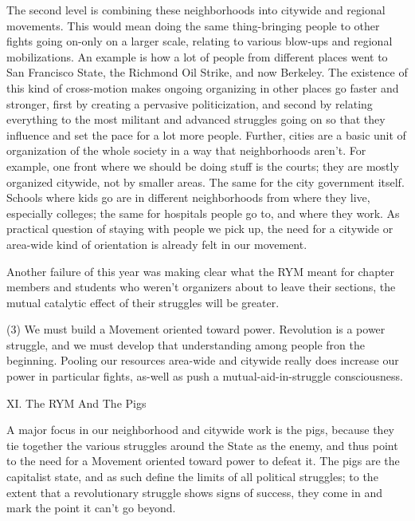 \documentclass[12pt, titlepage]{article}
\begin{document}
{\begin{spacing}{1.10}
The second level is combining these neighborhoods into citywide and regional movements. This would mean doing the same thing-bringing people to other fights going on-only on a larger scale, relating to various blow-ups and regional mobilizations. An example is how a lot of people from different places went to San Francisco State, the Richmond Oil Strike, and now Berkeley. The existence of this kind of cross-motion makes ongoing organizing in other places go faster and stronger, first by creating a pervasive politicization, and second by relating everything to the most militant and advanced struggles going on so that they influence and set the pace for a lot more people. Further, cities are a basic unit of organization of the whole society in a way that neighborhoods aren't. For example, one front where we should be doing stuff is the courts; they are mostly organized citywide, not by smaller areas. The same for the city government itself. Schools where kids go are in different neighborhoods from where they live, especially colleges; the same for hospitals people go to, and where they work. As practical question of staying with people we pick up, the need for a citywide or area-wide kind of orientation is already felt in our movement.

Another failure of this year was making clear what the RYM meant for chapter members and students who weren't organizers about to leave their sections, the mutual catalytic effect of their struggles will be greater.

(3) We must build a Movement oriented toward power. Revolution is a power struggle, and we must develop that understanding among people fron the beginning. Pooling our resources area-wide and citywide really does increase our power in particular fights, as-well as push a mutual-aid-in-struggle consciousness.

\begin{center}
XI. The RYM And The Pigs
\end{center}

A major focus in our neighborhood and citywide work is the pigs, because they tie together the various struggles around the State as the enemy, and thus point to the need for a Movement oriented toward power to defeat it. The pigs are the capitalist state, and as such define the limits of all political struggles; to the extent that a revolutionary struggle shows signs of success, they come in and mark the point it can't go beyond.


\end{spacing}}
\end{document}
